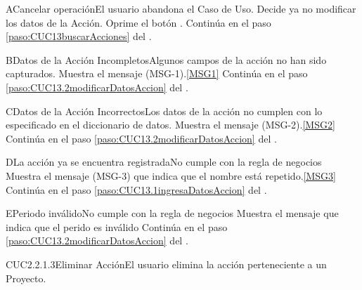 		\begin{UCtrayectoriaA}{A}{Cancelar operación}{El usuario abandona el Caso de Uso.}
			\UCpaso[\UCactor] Decide ya no modificar los datos de la Acción.
			\UCpaso[\UCactor] Oprime el botón .
			\UCpaso Continúa en el paso \ref{paso:CUC13buscarAcciones} del .
		\end{UCtrayectoriaA}

	\begin{UCtrayectoriaA}{B}{Datos de la Acción Incompletos}{Algunos campos de la acción no han sido capturados.}
			\UCpaso Muestra el mensaje (MSG-1).\ref{MSG1}
			\UCpaso Continúa en el paso \ref{paso:CUC13.2modificarDatosAccion} del .
	\end{UCtrayectoriaA}

	\begin{UCtrayectoriaA}{C}{Datos de la Acción Incorrectos}{Los datos de la acción no cumplen con lo especificado en el diccionario de datos.}
			\UCpaso Muestra el mensaje (MSG-2).\ref{MSG2}
			\UCpaso Continúa en el paso \ref{paso:CUC13.2modificarDatosAccion} del .
	\end{UCtrayectoriaA}
		\begin{UCtrayectoriaA}{D}{La acción ya se encuentra registrada}{No cumple con la regla de negocios }
			\UCpaso Muestra el mensaje (MSG-3) que indica que el nombre está repetido.\ref{MSG3}
			\UCpaso Continúa en el paso \ref{paso:CUC13.1ingresaDatosAccion} del .
		\end{UCtrayectoriaA}

		\begin{UCtrayectoriaA}{E}{Periodo inválido}{No cumple con la regla de negocios }
			\UCpaso Muestra el mensaje  que indica que el perido es inválido
			\UCpaso Continúa en el paso \ref{paso:CUC13.2modificarDatosAccion} del .
		\end{UCtrayectoriaA}

	\begin{UseCase}{CUC2.2.1.3}{Eliminar Acción}{El usuario elimina la acción perteneciente a un Proyecto.}
	\end{UseCase}

